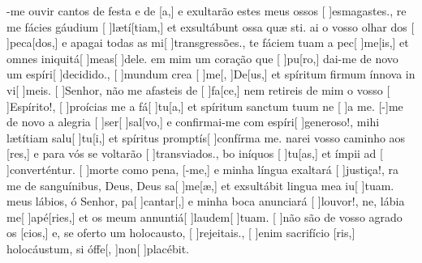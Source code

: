 {    {-me ouvir cantos de festa e de [a,] e exultarão estes meus ossos [ ]{es}{ma}{gas}tes.},
  {re me fácies gáudium [ ]{læ}{tí}[tiam,] et exsultábunt ossa quæ sti.}%
    {ai o vosso olhar dos [ ]{pe}{ca}[dos,] e apagai todas as mi[ ]{trans}{gres}{sões}.},
  {te fáciem tuam a pec[ ]{me}[is,] et omnes iniquitá[ ]{me}{as}[ ]{de}le.}%
    { em mim um coração que [ ]{pu}[ro,] dai-me de novo um espíri[ ]{de}{ci}{di}do.},
  {[ ]{mun}dum crea [ ]{me}[, ]{De}[us,] et spíritum firmum ínnova in vi[ ]{me}is.}%
    {[ ]{Se}nhor, não me afasteis de [ ]{fa}[ce,] nem retireis de mim o vosso [ ]{Es}{píri}to!},
  {[ ]{pro}ícias me a fá[ ]{tu}[a,] et spíritum sanctum tuum ne [ ]{a} me.}%
    {[-]{me} de novo a alegria [ ]{ser}[ ]{sal}[vo,] e confir\-mai-me com espíri[ ]{ge}{ne}{ro}so!},
  { mihi lætítiam salu[ ]{tu}[i,] et spíritus promptís[ ]{con}{fírma} me.}%
    {narei vosso caminho aos [res,] e para vós se voltarão [ ]{trans}{vi}{a}dos.},
  {bo iníquos [ ]{tu}[as,] et ímpii ad [ ]{con}{ver}{tén}{\-tur.}}%
    {[ ]{mor}te como pena, [-me,] e minha língua exaltará [ ]{jus}{ti}ça!},
  {ra me de sanguínibus, Deus, Deus sa[ ]{me}[\-æ,] et exsultábit lingua mea iu[ ]{tu}am.}%
    { meus lábios, ó Senhor, pa[ ]{can}{tar}[,] e minha boca anunciará [ ]{lou}{vor}!},
  {ne, lábia me[ ]{a}{pé}[ries,] et os meum annuntiá[ ]{lau}{dem}[ ]{tu}am.}%
    {[ ]{não} são de vosso agrado os [cios,] e, se oferto um holocausto, [ ]{re}{jei}{tais}.},
  {[ ]{e}nim sacrifício [ris,] holocáustum, si óffe[, ]{non}[ ]{pla}{cé}bit.}%
}
